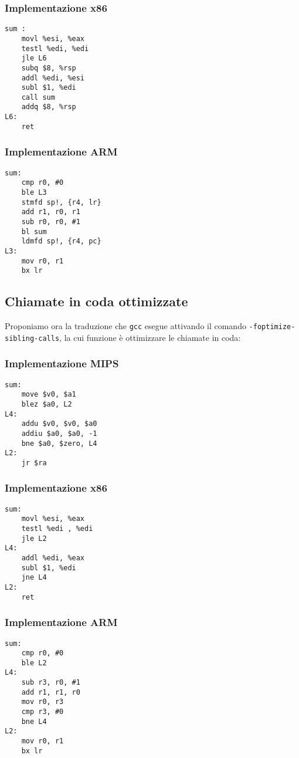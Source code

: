 \documentclass[class=book, crop=false, oneside]{standalone}
\begin{document}
\subsubsection{Implementazione x86}

\begin{verbatim}
sum :
	movl %esi, %eax
	testl %edi, %edi
	jle L6
	subq $8, %rsp
	addl %edi, %esi
	subl $1, %edi
	call sum
	addq $8, %rsp
L6:
	ret
\end{verbatim}

\subsubsection{Implementazione ARM}

\begin{verbatim}
sum:
	cmp r0, #0
	ble L3
	stmfd sp!, {r4, lr}
	add r1, r0, r1
	sub r0, r0, #1
	bl sum
	ldmfd sp!, {r4, pc}
L3:
	mov r0, r1
	bx lr
\end{verbatim}

\subsection*{Chiamate in coda ottimizzate}
Proponiamo ora la traduzione che \texttt{gcc} esegue attivando il comando \texttt{-foptimize-sibling-calls}, la cui funzione è ottimizzare le chiamate in coda:
\subsubsection{Implementazione MIPS}

\begin{verbatim}
sum:
	move $v0, $a1
	blez $a0, L2
L4:
	addu $v0, $v0, $a0
	addiu $a0, $a0, -1
	bne $a0, $zero, L4
L2:
	jr $ra
\end{verbatim}

\subsubsection{Implementazione x86}

\begin{verbatim}
sum:
	movl %esi, %eax
	testl %edi , %edi
	jle L2
L4:
	addl %edi, %eax
	subl $1, %edi
	jne L4
L2:
	ret
\end{verbatim}

\subsubsection{Implementazione ARM}

\begin{verbatim}
sum:
	cmp r0, #0
	ble L2
L4:
	sub r3, r0, #1
	add r1, r1, r0
	mov r0, r3
	cmp r3, #0
	bne L4
L2:
	mov r0, r1
	bx lr
\end{verbatim}
\end{document}
